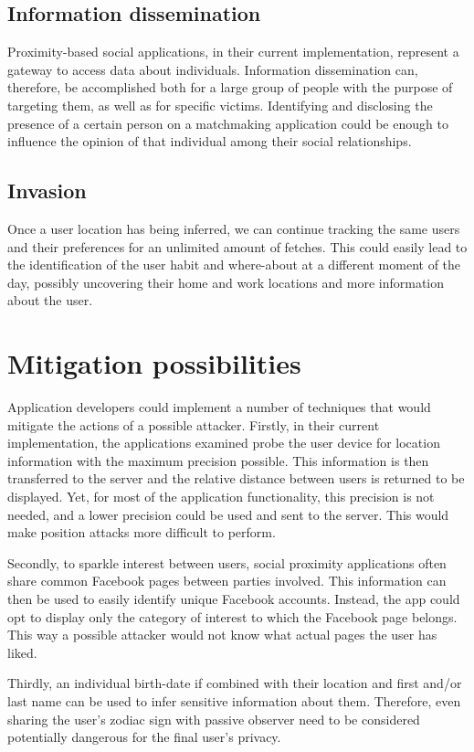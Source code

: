 \subsection{Information dissemination}
\noindent
Proximity-based social applications, in their current implementation, represent a gateway to access data about individuals. Information dissemination can, therefore, be accomplished both for a large group of people with the purpose of targeting them, as well as for specific victims.
Identifying and disclosing the presence of a certain person on a matchmaking application could be enough to influence the opinion of that individual among their social relationships.

\subsection{Invasion}
Once a user location has being inferred, we can continue tracking the same users and their preferences for an unlimited amount of fetches. This could easily lead to the identification of the user habit and where-about at a different moment of the day, possibly uncovering their home and work locations and more information about the user.

\section{Mitigation possibilities}
\noindent
Application developers could implement a number of techniques that would mitigate the actions of a possible attacker. Firstly, in their current implementation, the applications examined probe the user device for location information with the maximum precision possible. This information is then transferred to the server and the relative distance between users is returned to be displayed. Yet, for most of the application functionality, this precision is not needed, and a lower precision could be used and sent to the server. This would make position attacks more difficult to perform.

Secondly, to sparkle interest between users, social proximity applications often share common Facebook pages between parties involved. This information can then be used to easily identify unique Facebook accounts. Instead, the app could opt to display only the category of interest to which the Facebook page belongs. This way a possible attacker would not know what actual pages the user has liked.

Thirdly, an individual birth-date if combined with their location and first and/or last name can be used to infer sensitive information about them. Therefore, even sharing the user's zodiac sign with passive observer need to be considered potentially dangerous for the final user's privacy.

